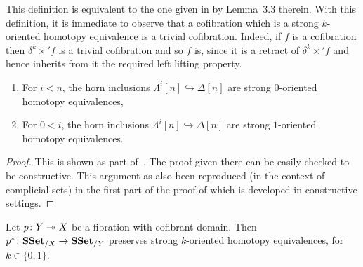 \documentclass[reqno,10pt,a4paper,oneside,draft]{amsart}
\begin{document}
This definition is equivalent to the one given in \cite{gambino2017frobenius} by Lemma~3.3 therein.
With this definition, it is immediate to observe that a cofibration which is a strong $k$-oriented homotopy equivalence is a trivial cofibration. Indeed, if $f$ is a cofibration then $\delta^k \times ' f$ is a trivial
cofibration and so $f$ is, since it is a retract of $\delta^k \times ' f$ and hence inherits from it the
required left lifting property.

\begin{lemma}\label{lemma:genTcof_strongHequiv} \hfill 
\begin{enumerate}[$(i)$]
\item For $i < n$, the horn inclusions $\Lambda^i[n] \hookrightarrow \Delta[n]$ are strong $0$-oriented homotopy equivalences,
\item For $0 < i $, the horn inclusions $\Lambda^i[n] \hookrightarrow \Delta[n]$ are strong $1$-oriented homotopy equivalences.
\end{enumerate}
\end{lemma}

\begin{proof}
This is shown as part of~\cite[Theorem 3.2.3]{joyal-tierney:simplicial-homotopy-theory}. The proof given there can be easily checked to be constructive. This argument as also been reproduced (in the context of complicial sets) in the first part of the proof of \cite[Proposition~5.2.6]{henry2018wms} which is developed in constructive settings.
\end{proof}




\begin{lemma} 
\label{lemma:pb_of_StrongHomotopyEq}
Let $p \colon Y \twoheadrightarrow X$ be a fibration with cofibrant domain. Then $p^* \colon \mathbf{SSet}_{/X} \to \mathbf{SSet}_{/Y}$ preserves strong $k$-oriented homotopy equivalences, for $k \in \{0,1\}$.
\end{lemma}
\end{document}
